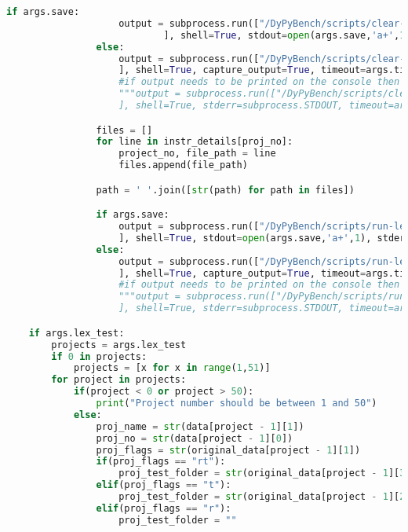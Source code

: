 \begin{lstlisting}[caption=Access Interface of DyPyBench.,label=code:dypybench.py,language=Python]
                if args.save:
                    output = subprocess.run(["/DyPyBench/scripts/clear-project.sh %s %s" %(proj_name, proj_no)
                            ], shell=True, stdout=open(args.save,'a+',1), stderr=subprocess.STDOUT, timeout=args.timeout)
                else:
                    output = subprocess.run(["/DyPyBench/scripts/clear-project.sh %s %s" %(proj_name, proj_no)
                    ], shell=True, capture_output=True, timeout=args.timeout)
                    #if output needs to be printed on the console then comment above and uncomment below
                    """output = subprocess.run(["/DyPyBench/scripts/clear-project.sh %s %s" %(proj_name, proj_no)
                    ], shell=True, stderr=subprocess.STDOUT, timeout=args.timeout)"""

                files = []
                for line in instr_details[proj_no]:
                    project_no, file_path = line
                    files.append(file_path)

                path = ' '.join([str(path) for path in files])

                if args.save:
                    output = subprocess.run(["/DyPyBench/scripts/run-lex-instrumentation.sh %s %s %s %s" %(proj_name, proj_no, args.timeout, path)
                    ], shell=True, stdout=open(args.save,'a+',1), stderr=subprocess.STDOUT, timeout=args.timeout)
                else:
                    output = subprocess.run(["/DyPyBench/scripts/run-lex-instrumentation.sh %s %s %s %s" %(proj_name, proj_no, args.timeout, path)
                    ], shell=True, capture_output=True, timeout=args.timeout)
                    #if output needs to be printed on the console then comment above and uncomment below
                    """output = subprocess.run(["/DyPyBench/scripts/run-lex-instrumentation.sh %s %s %s %s" %(proj_name, proj_no, args.timeout, path)
                    ], shell=True, stderr=subprocess.STDOUT, timeout=args.timeout)"""

    if args.lex_test:
        projects = args.lex_test
        if 0 in projects:
            projects = [x for x in range(1,51)]
        for project in projects:
            if(project < 0 or project > 50):
                print("Project number should be between 1 and 50")
            else:
                proj_name = str(data[project - 1][1])
                proj_no = str(data[project - 1][0])
                proj_flags = str(original_data[project - 1][1])
                if(proj_flags == "rt"):
                    proj_test_folder = str(original_data[project - 1][3])
                elif(proj_flags == "t"):
                    proj_test_folder = str(original_data[project - 1][2])
                elif(proj_flags == "r"):
                    proj_test_folder = ""


\end{lstlisting}
